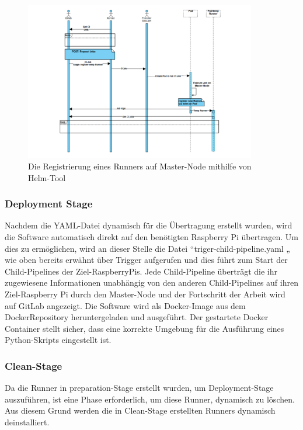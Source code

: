 \begin{figure}[bth] 
	\centering
	\includegraphics[width=0.9\textwidth]{Graphics/register-temp-runner.png}
	\caption{Die Registrierung eines Runners auf Master-Node mithilfe von Helm-Tool}
	\label{fig:rigister-temp-runner}
\end{figure}



\subsubsection*{Deployment Stage}

Nachdem die YAML-Datei dynamisch für die Übertragung erstellt wurden, wird die Software automatisch direkt auf den benötigten Raspberry Pi übertragen. Um dies zu ermöglichen, wird an dieser Stelle die Datei “triger-child-pipeline.yaml „ wie oben bereits erwähnt über Trigger aufgerufen und dies führt zum Start der Child-Pipelines der Ziel-RaspberryPis. Jede Child-Pipeline überträgt die ihr zugewiesene Informationen unabhängig von den anderen Child-Pipelines auf ihren Ziel-Raspberry Pi durch den Master-Node und der Fortschritt der Arbeit wird auf GitLab angezeigt. Die Software wird als Docker-Image aus dem DockerRepository heruntergeladen und ausgeführt. Der gestartete Docker Container stellt sicher, dass eine korrekte Umgebung für die Ausführung eines Python-Skripts eingestellt ist.

\subsubsection*{Clean-Stage}

Da die Runner in preparation-Stage erstellt wurden, um Deployment-Stage auszuführen, ist eine Phase erforderlich, um diese Runner, dynamisch zu löschen. Aus diesem Grund werden die in Clean-Stage erstellten Runners dynamisch deinstalliert.